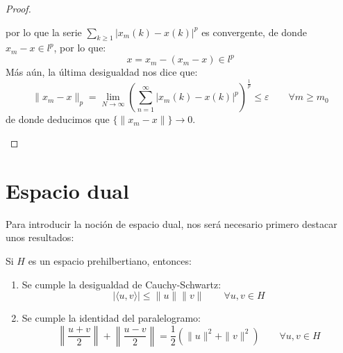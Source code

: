 \begin{prop}
\begin{proof}
\begin{description}
                por lo que la serie $\sum_{k\geq 1}{|x_m(k)-x(k)|}^{p}$ es convergente, de donde $x_m-x\in l^p$, por lo que:
                \begin{equation*}
                    x = x_m - (x_m - x) \in l^p
                \end{equation*}
                Más aún, la última desigualdad nos dice que:
                \begin{equation*}
                    \|x_m - x\|_p  = \lim_{N\to\infty}{\left(\sum_{n=1}^{\infty}{|x_m(k)-x(k)|}^{p}\right)}^{\frac{1}{p}} \leq \varepsilon \qquad \forall m\geq m_0
                \end{equation*}
                de donde deducimos que $\{\|x_m - x\|\}\to 0$.
        \end{description}
    \end{proof}
\end{prop}

\section{Espacio dual}
Para introducir la noción de espacio dual, nos será necesario primero destacar unos resultados:
\begin{prop}
    Si $H$ es un espacio prehilbertiano, entonces:
    \begin{enumerate}
        \item Se cumple la desigualdad de Cauchy-Schwartz:
            \begin{equation*}
                |\langle u,v \rangle | \leq \|u\|\|v\| \qquad \forall u,v\in H
            \end{equation*}
        \item Se cumple la identidad del paralelogramo:
            \begin{equation*}
                \left\|\dfrac{u+v}{2}\right\| + \left\| \dfrac{u-v}{2}\right\| = \dfrac{1}{2}(\|u\|^2 + \|v\|^2) \qquad \forall u,v\in H
            \end{equation*}
    \end{enumerate}
\end{prop}

